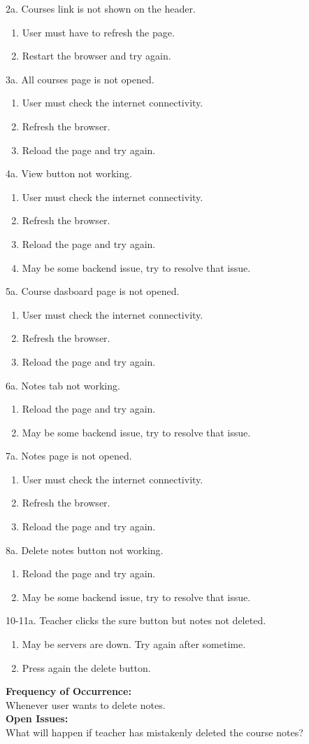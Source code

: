 2a. Courses link is not shown on the header.
\begin{enumerate}
\item User must have to refresh the page.
\item Restart the browser and try again.
\end{enumerate} 
3a. All courses page is not opened.
\begin{enumerate}
\item User must check the internet connectivity.
\item Refresh the browser.
\item Reload the page and try again.
\end{enumerate}
4a. View button not working.
\begin{enumerate}
\item User must check the internet connectivity.
\item Refresh the browser.
\item Reload the page and try again.
\item May be some backend issue, try to resolve that issue.
\end{enumerate}
5a. Course dasboard page is not opened.
\begin{enumerate}
\item User must check the internet connectivity.
\item Refresh the browser.
\item Reload the page and try again.
\end{enumerate}
6a. Notes tab not working.
\begin{enumerate}
\item Reload the page and try again.
\item May be some backend issue, try to resolve that issue.
\end{enumerate}
7a. Notes page is not opened.
\begin{enumerate}
\item User must check the internet connectivity.
\item Refresh the browser.
\item Reload the page and try again.
\end{enumerate}
8a. Delete notes button not working.
\begin{enumerate}
\item Reload the page and try again.
\item May be some backend issue, try to resolve that issue.
\end{enumerate}
10-11a. Teacher clicks the sure button but notes not deleted.
\begin{enumerate}
\item May be servers are down. Try again after sometime.
\item Press again the delete button.
\end{enumerate}
\textbf{Frequency of Occurrence:}\\
Whenever user wants to delete notes.\\
\textbf{Open Issues:}\\
What will happen if teacher has mistakenly deleted the course notes?






